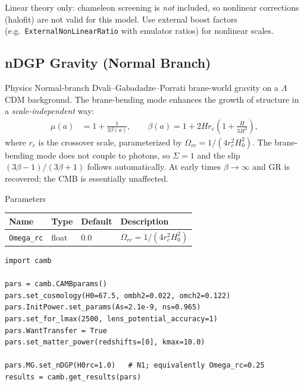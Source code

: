 \documentclass[11pt,a4paper]{article}
\begin{document}
\begin{notebox}
Linear theory only: chameleon screening is \emph{not} included, so nonlinear corrections (halofit) are not valid for this model. Use external boost factors (e.g.\ \texttt{ExternalNonLinearRatio} with emulator ratios) for nonlinear scales.
\end{notebox}


\newpage
\subsection{nDGP Gravity (Normal Branch)}

\begin{physbox}{Physics}
Normal-branch Dvali--Gabadadze--Porrati brane-world gravity on a $\Lambda$CDM background. The brane-bending mode enhances the growth of structure in a \emph{scale-independent} way:
\begin{align}
    \mu(a) &= 1 + \frac{1}{3\beta(a)}, \qquad
    \beta(a) = 1 + 2 H r_c \left( 1 + \frac{\dot H}{3 H^2} \right),
\end{align}
where $r_c$ is the crossover scale, parameterized by $\Omega_{rc} = 1/(4 r_c^2 H_0^2)$. The brane-bending mode does not couple to photons, so $\Sigma = 1$ and the slip $(3\beta-1)/(3\beta+1)$ follows automatically. At early times $\beta \to \infty$ and GR is recovered; the CMB is essentially unaffected.
\end{physbox}

\begin{parambox}{Parameters}
\begin{tabular}{llll}
\toprule
Name & Type & Default & Description \\
\midrule
\texttt{Omega\_rc} & float & 0.0 & $\Omega_{rc} = 1/(4 r_c^2 H_0^2)$ \\
\bottomrule
\end{tabular}
\end{parambox}

\begin{lstlisting}
import camb

pars = camb.CAMBparams()
pars.set_cosmology(H0=67.5, ombh2=0.022, omch2=0.122)
pars.InitPower.set_params(As=2.1e-9, ns=0.965)
pars.set_for_lmax(2500, lens_potential_accuracy=1)
pars.WantTransfer = True
pars.set_matter_power(redshifts=[0], kmax=10.0)

pars.MG.set_nDGP(H0rc=1.0)   # N1; equivalently Omega_rc=0.25
results = camb.get_results(pars)
\end{lstlisting}
\end{document}
